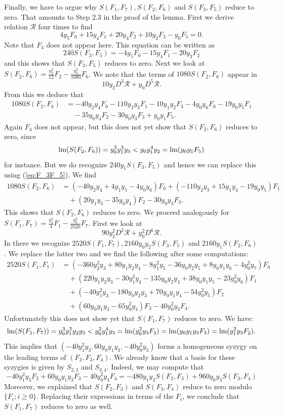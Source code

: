 Finally, we have to argue why $S(F_1,F_7), S(F_2,F_6)$ and $S(F_3,F_5)$ reduce to zero. That amounts to Step 2.3 in the proof of the lemma. First we derive relation $\mathcal{R}$ four times to find
\[ 4y_5F_0 + 15y_4F_1 + 20y_3F_2 +10y_2F_3 - y_0F_5 = 0.  \]
Note that $F_4$ does not appear here. This equation can be written as
\begin{equation}\label{eq:F_3F_5}
 240S(F_3,F_5) = -4y_5F_0 - 15y_4F_1 - 20y_3F_2
 \end{equation}
and this shows that $S(F_3,F_5)$ reduces to zero. Next we look at $S(F_2,F_6) = \frac{y_2^2}{12}F_2 - \frac{y_0^2}{1080}F_6$. We note that the terms of $1080S(F_2,F_6)$ appear in  
\[ 10y_2 D^3 \mathcal{R} + y_0 D^5\mathcal{R}.  \] 
From this we deduce that
\begin{align*}
 1080S(F_2,F_6) & = - 40 y_2y_4F_0 - 110 y_2 y_3 F_1 - 10 y_1y_2F_3  - 4y_0y_6F_0 - 19y_0y_5 F_1\\
  & \quad  -35 y_0y_4 F_2 -30 y_0y_3 F_3 + y_0y_1F_5. 
\end{align*}
Again $F_4$ does not appear, but this does not yet show that $S(F_2,F_6)$ reduces to zero, since 
\[ \textnormal{lm}(S(F_2,F_6)) = y_0^2y_1^3y_3 < y_0y_1^4y_2 = \textnormal{lm}(y_0y_1F_5)\]
for instance. But we do recognize $240y_1S(F_3,F_5)$ and hence we can replace this using (\ref{eq:F_3F_5}). We find
\begin{align*}
 1080S(F_2,F_6) & = (- 40 y_2y_4 +4y_1y_5 - 4y_0y_6) F_0 + (- 110 y_2 y_3   + 15y_1y_4   - 19y_0y_5) F_1\\
  & \quad  + (20y_1y_3 -35 y_0y_4) F_2 - 30 y_0y_3 F_3. 
\end{align*}
This shows that $S(F_2,F_6)$ reduces to zero. We proceed analogously for $S(F_1,F_7) = \frac{y_2^3}{4}F_1 - \frac{y_0^3}{2520}F_7$. First we look at 
\[ 90 y_2^2 D^2 \mathcal{R} + y_0^2 D^6\mathcal{R}. \]
In there we recognize $2520S(F_1,F_7), 2160y_0y_2S(F_3,F_5)$ and $2160y_1S(F_2,F_6)$. We replace the latter two and we find the following after some computations:
\begin{align*}
 2520S(F_1,F_7) & = (-360y_2^2y_3 + 80 y_1y_2y_4 -8y_1^2y_5-36y_0y_2y_5+ 8y_0y_1y_6- 4y_0^2y_7)F_0 \\
 & \quad + (220 y_1y_2 y_3 - 30y_1^2y_4  -135y_0y_2y_4+ 38y_0y_1y_5 - 23y_0^2y_6) F_1 \\
 & \quad + ( -40y_1^2y_3- 180y_0y_2y_3+70 y_0y_1y_4 - 54y_0^2y_5)F_2 \\
  & \quad  + ( 60 y_0y_1y_3- 65y_0^2y_4 )F_3 - 40y_0^2y_3F_4 .
\end{align*}
Unfortunately this does not show yet that $S(F_1,F_7)$ reduces to zero. We have:
\[ \textnormal{lm}(S(F_1,F_7)) = y_0^3y_1^2y_2y_3 < y_0^2y_1^4y_3 = \textnormal{lm}(y_0^2y_3F_4) = \textnormal{lm}(y_0y_1y_3F_3) = \textnormal{lm}(y_1^2y_3F_2).\]
This implies that $( -40y_1^2y_3 , 60 y_0y_1y_3, - 40y_0^2y_3)$ forms a homogeneous syzygy on the leading terms of $(F_2,F_3,F_4)$. We already know that a basis for these syzygies is given by $S_{2,3}$ and $S_{3,4}$. Indeed, we may compute that
\[ -40y_1^2y_3F_2 + 60 y_0y_1y_3F_3 - 40y_0^2y_3F_4 = -480y_1y_3S(F_2,F_3) + 960y_0y_3S(F_3,F_4)\]
Moreover, we explained that $S(F_2,F_3)$ and $S(F_3,F_4)$ reduce to zero modulo $\{F_i; i\geq 0\}$. Replacing their expressions in terms of the $F_i$, we conclude that $S(F_1,F_7)$ reduces to zero as well.


